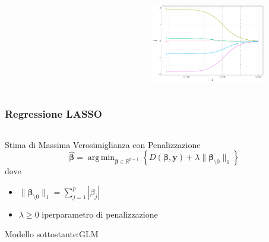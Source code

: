 \documentclass[pdf, aspectratio=169]{beamer}\usepackage[]{graphicx}\usepackage[]{color}
\DeclareMathOperator*{\argmin}{arg\,min}  %
\theoremstyle{definition}
\begin{document}
\begin{frame}
\begin{columns}[c]
\begin{column}{0.55\linewidth}
\begin{figure}
\begin{subfigure}[b]{3cm}
    \end{subfigure}
  \end{figure}
\end{column}
\begin{column}{0.45\linewidth}
  \begin{figure}
    \centering
    \includegraphics[width=5cm]{_bookdown_files/_main_files/figure-latex/ridge-lambda-5.pdf}
  \end{figure}
\end{column}
\end{columns}

\end{frame}


\begin{frame}
\frametitle{Regressione LASSO}

\fontsize{9pt}{11pt}\selectfont

\begin{columns}
\begin{column}{0.8\linewidth}
  \begin{block}{Stima di Massima Verosimiglianza con Penalizzazione}
    $$
    \hat{\boldsymbol{\beta}} = \argmin_{\boldsymbol{\beta}\in\mathbb{R}^{p+1}}{\left\{D(\boldsymbol{\beta}, \boldsymbol{y}) + \lambda \|\boldsymbol{\beta}_{\setminus0}\|_1\right\}}
    $$
    dove
    \begin{itemize}
      \item $\|\boldsymbol{\beta}_{\setminus0}\|_1 = \sum_{j=1}^p{|\beta_j|}$
      \item $\lambda\ge0$ iperparametro di penalizzazione
    \end{itemize}
    
    \vspace{0.2cm}
    
    Modello sottostante:GLM
  \end{block}
\end{column}
\end{columns}

\end{frame}
\end{document}

